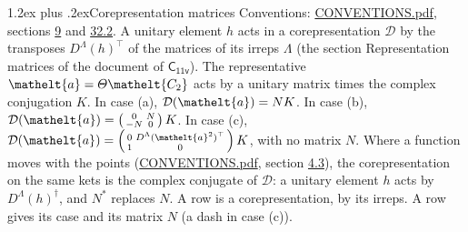 \documentclass[10pt,a4paper]{article}
\makeatletter
\renewcommand\section{\@startsection{section}{1}{\z@}{-3ex plus -1ex minus -.2ex}%
  {1.2ex plus .2ex}{\normalfont\large\sffamily\bfseries\color{parttitle}}}
\numberwithin{equation}{section}
\newcommand{\eltfont}[1]{{\let\sigma\eltsigma\mathelt{#1}}}
\newcommand{\grp}[1]{\mathsf{#1}}
\newcommand{\elt}[1]{\eltfont{#1}}
\makeatother
\begin{document}
\section{Corepresentation matrices}\label{s:corep_matrices}
Conventions: \href{../../CONVENTIONS.pdf}{CONVENTIONS.pdf}, sections \href{../../../rotation/CONVENTIONS.pdf\#conv.9}{9} and \href{../../CONVENTIONS.pdf\#conv.32.2}{32.2}.
A unitary element $h$ acts in a corepresentation $\mathcal{D}$ by the transposes $D^{\Lambda}(h)^{\top}$ of the matrices of its irreps $\Lambda$ (the section Representation matrices of the document of \href{../../../rotation/data/pdf/C11v.pdf}{$\grp{C_{11v}}$}). The representative $\elt{a} = \varTheta\elt{C_{2}}$ acts by a unitary matrix times the complex conjugation $K$.
In case (a), $\mathcal{D}(\elt{a}) = NK$. In case (b), $\mathcal{D}(\elt{a}) = \left(\begin{smallmatrix} 0 & N \\ -N & 0 \end{smallmatrix}\right) K$. In case (c), $\mathcal{D}(\elt{a}) = \left(\begin{smallmatrix} 0 & D^{\Lambda}(\elt{a}^2)^{\top} \\ 1 & 0 \end{smallmatrix}\right) K$, with no matrix $N$.
Where a function moves with the points (\href{../../CONVENTIONS.pdf}{CONVENTIONS.pdf}, section \href{../../../rotation/CONVENTIONS.pdf\#conv.4.3}{4.3}), the corepresentation on the same kets is the complex conjugate of $\mathcal{D}$: a unitary element $h$ acts by $D^{\Lambda}(h)^{\dagger}$, and $N^{*}$ replaces $N$.
A row is a corepresentation, by its irreps. A row gives its case and its matrix $N$ (a dash in case (c)).
\end{document}
